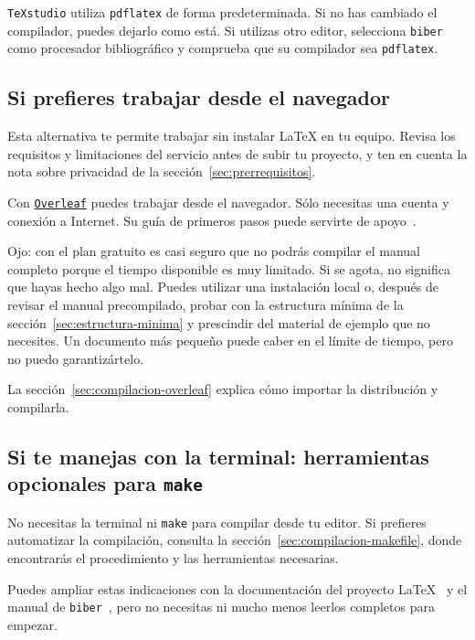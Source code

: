 \texttt{TeXstudio} utiliza \texttt{pdflatex} de forma predeterminada. Si no has cambiado el compilador, puedes dejarlo como está. Si utilizas otro editor, selecciona \texttt{biber} como procesador bibliográfico y comprueba que su compilador sea \texttt{pdflatex}.

\subsection{Si prefieres trabajar desde el navegador}
\label{sec:entorno-navegador}
\label{sec:entorno-overleaf}

Esta alternativa te permite trabajar sin instalar \LaTeX{} en tu equipo. Revisa los requisitos y limitaciones del servicio antes de subir tu proyecto, y ten en cuenta la nota sobre privacidad de la sección~\ref{sec:prerrequisitos}.

Con \href{https://www.overleaf.com/}{\texttt{Overleaf}} puedes trabajar desde el navegador. Sólo necesitas una cuenta y conexión a Internet. Su guía de primeros pasos puede servirte de apoyo~\cite{overleaf-first-project}.

Ojo: con el plan gratuito es casi seguro que no podrás compilar el manual completo porque el tiempo disponible es muy limitado. Si se agota, no significa que hayas hecho algo mal. Puedes utilizar una instalación local o, después de revisar el manual precompilado, probar con la estructura mínima de la sección~\ref{sec:estructura-minima} y prescindir del material de ejemplo que no necesites. Un documento más pequeño puede caber en el límite de tiempo, pero no puedo garantizártelo.

La sección~\ref{sec:compilacion-overleaf} explica cómo importar la distribución y compilarla.

\subsection{Si te manejas con la terminal: herramientas opcionales para \texttt{make}}

No necesitas la terminal ni \texttt{make} para compilar desde tu editor. Si prefieres automatizar la compilación, consulta la sección~\ref{sec:compilacion-makefile}, donde encontrarás el procedimiento y las herramientas necesarias.

Puedes ampliar estas indicaciones con la documentación del proyecto \LaTeX{}~\cite{latex-project-docs} y el manual de \texttt{biber}~\cite{biber-manual}, pero no necesitas ni mucho menos leerlos completos para empezar.

